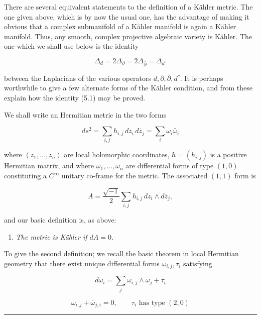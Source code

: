 \documentclass[
  english,
  a3paper,
  a3paper]{extarticle}
\providecommand{\tightlist}{%
  \setlength{\itemsep}{0pt}\setlength{\parskip}{0pt}}
\begin{document}
There are several equivalent statements to the definition of a Kähler
metric. The one given above, which is by now the usual one, has the
advantage of making it obvious that a complex submanifold of a Kähler
manifold is again a Kähler manifold. Thus, any smooth, complex
projective algebraic variety is Kähler. The one which we shall use below
is the identity

\[\tag{5.1}\Delta_d=2\Delta_{\partial}=2\Delta_{\bar\partial}=\Delta_{d^c}\]

between the Laplacians of the various operators
\(d,\partial,\bar\partial,d^c\). It is perhaps worthwhile to give a few
alternate forms of the Kähler condition, and from these explain how the
identity (5.1) may be proved.

We shall write an Hermitian metric in the two forms

\[ds^2=\sum_{i,j}h_{i,j}\,dz_i\,d\bar z_j=\sum_i\omega_i\bar\omega_i\]

where \((z_1,\ldots,z_n)\) are local holomorphic coordinates,
\(h=(h_{i,j})\) is a positive Hermitian matrix, and where
\(\omega_1,\ldots,\omega_n\) are differential forms of type \((1,0)\)
constituting a \(C^\infty\) unitary co-frame for the metric. The
associated \((1,1)\) form is

\[A=\frac{\sqrt{-1}}{2}\sum_{i,j}h_{i,j}\,dz_i\wedge d\bar z_j,\]

and our basic definition is, as above:

\begin{enumerate}
\def\labelenumi{(\roman{enumi})}
\tightlist
\item
  \emph{The metric is Kähler if \(dA=0\).}
\end{enumerate}

To give the second definition; we recall the basic theorem in local
Hermitian geometry that there exist unique differential forms
\(\omega_{i,j},\tau_i\) satisfying

\[d\omega_i=\sum_j\omega_{i,j}\wedge\omega_j+\tau_i\]

\[\tag{5.2}\omega_{i,j}+\bar\omega_{j,i}=0,\qquad \tau_i\text{ has type }(2,0)\]

\clearpage



\par

\vspace{0.7mm}\hrule\vspace{1.6mm}
\end{document}

